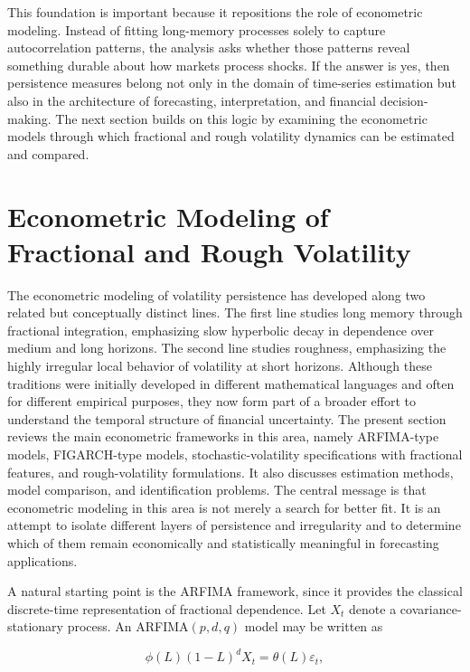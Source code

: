 \documentclass[12pt]{article}
\begin{document}
This foundation is important because it repositions the role of econometric modeling. Instead of fitting long-memory processes solely to capture autocorrelation patterns, the analysis asks whether those patterns reveal something durable about how markets process shocks. If the answer is yes, then persistence measures belong not only in the domain of time-series estimation but also in the architecture of forecasting, interpretation, and financial decision-making. The next section builds on this logic by examining the econometric models through which fractional and rough volatility dynamics can be estimated and compared.



\section{Econometric Modeling of Fractional and Rough Volatility}
\label{sec:econometric}

The econometric modeling of volatility persistence has developed along two related but conceptually distinct lines. The first line studies long memory through fractional integration, emphasizing slow hyperbolic decay in dependence over medium and long horizons. The second line studies roughness, emphasizing the highly irregular local behavior of volatility at short horizons. Although these traditions were initially developed in different mathematical languages and often for different empirical purposes, they now form part of a broader effort to understand the temporal structure of financial uncertainty. The present section reviews the main econometric frameworks in this area, namely ARFIMA-type models, FIGARCH-type models, stochastic-volatility specifications with fractional features, and rough-volatility formulations. It also discusses estimation methods, model comparison, and identification problems. The central message is that econometric modeling in this area is not merely a search for better fit. It is an attempt to isolate different layers of persistence and irregularity and to determine which of them remain economically and statistically meaningful in forecasting applications.

A natural starting point is the ARFIMA framework, since it provides the classical discrete-time representation of fractional dependence. Let $X_t$ denote a covariance-stationary process. An ARFIMA$(p,d,q)$ model may be written as

\[\phi(L)(1-L)^d X_t = \theta(L)\varepsilon_t,\]
\end{document}
